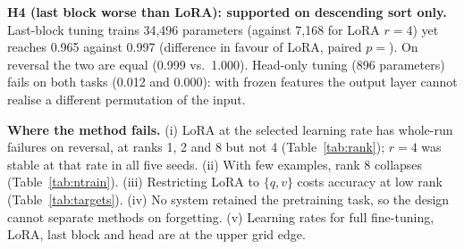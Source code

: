 \textbf{H4 (last block worse than LoRA): supported on descending sort only.} Last-block tuning trains 34,496 parameters (against 7,168 for LoRA $r=4$) yet reaches 0.965 against 0.997 (difference  in favour of LoRA, paired $p=$). On reversal the two are equal (0.999 vs.\ 1.000). Head-only tuning (896 parameters) fails on both tasks (0.012 and 0.000): with frozen features the output layer cannot realise a different permutation of the input.

\begin{table}[t]\centering\caption{Paired $t$-tests over the five seeds (main group): the statistics of \texttt{rh compare} with LoRA $r=4$ as the reference (A). Retention comparisons are identical across systems empirically (every system at the floor), so no test is defined.}\label{tab:tests}\resizebox{\columnwidth}{!}{}\end{table}

\textbf{Where the method fails.} (i) LoRA at the selected learning rate has whole-run failures on reversal, at ranks 1, 2 and 8 but not 4 (Table~\ref{tab:rank}); $r=4$ was stable at that rate in all five seeds. (ii) With few examples, rank 8 collapses (Table~\ref{tab:ntrain}). (iii) Restricting LoRA to $\{q,v\}$ costs accuracy at low rank (Table~\ref{tab:targets}). (iv) No system retained the pretraining task, so the design cannot separate methods on forgetting. (v) Learning rates for full fine-tuning, LoRA, last block and head are at the upper grid edge.
